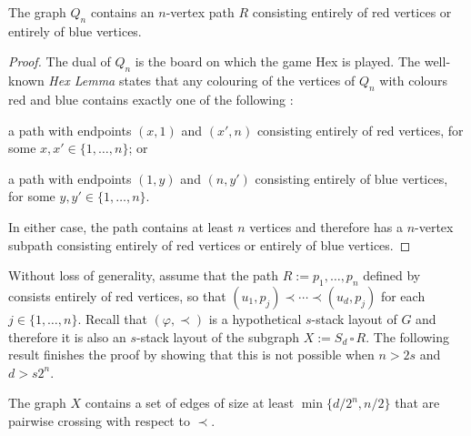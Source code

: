 \documentclass[kpfonts]{patmorin}
\newcommand{\CartProd}{\,\square\,}
\begin{document}
\begin{lem}
    The graph $Q_n$ contains an $n$-vertex path $R$ consisting entirely of red vertices or entirely of blue vertices.
\end{lem}

\begin{proof}
    The dual of $Q_n$ is the board on which the game Hex is played.  The well-known \emph{Hex Lemma} states that any colouring of the vertices of $Q_n$ with colours red and blue contains exactly one of the following \cite{Gale79}:
    \begin{compactenum}
        \item a path with endpoints $(x,1)$ and $(x',n)$ consisting entirely of red vertices, for some $x,x'\in\{1,\ldots,n\}$; or
        \item a path with endpoints $(1,y)$ and $(n,y')$ consisting entirely of blue vertices, for some $y,y'\in\{1,\ldots,n\}$.
    \end{compactenum}
    In either case, the path contains at least $n$ vertices and therefore has a $n$-vertex subpath consisting entirely of red vertices or entirely of blue vertices.
\end{proof}

Without loss of generality, assume that the path $R:=p_1,\ldots,p_n$ defined by  consists entirely of red vertices, so that $(u_1,p_j)\prec\cdots\prec (u_d,p_j)$ for each $j\in\{1,\ldots,n\}$.
Recall that $(\varphi,\prec)$ is a hypothetical $s$-stack layout of $G$ and therefore it is also an $s$-stack layout of the subgraph $X:=S_d\CartProd R$.  The following result finishes the proof by showing that this is not possible when $n> 2s$ and $d> s2^{n}$.

\begin{lem}
    The graph $X$ contains a set of edges of size at least $\min\{d/2^{n},n/2\}$ that are pairwise crossing with respect to $\prec$.
\end{lem}
\end{document}

